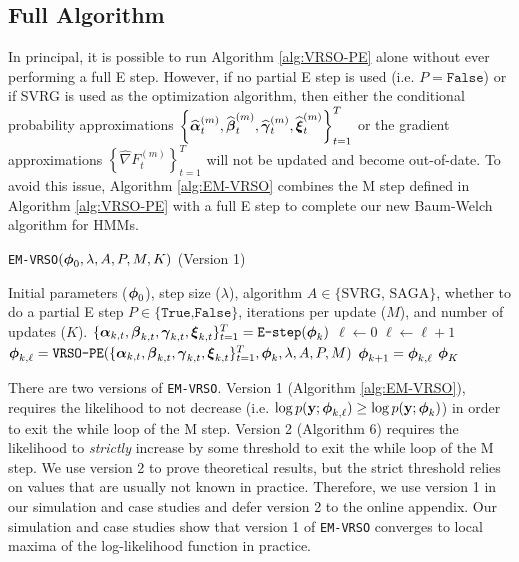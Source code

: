 \subsection{Full Algorithm}

In principal, it is possible to run Algorithm \ref{alg:VRSO-PE} alone without ever performing a full E step. However, if no partial E step is used (i.e. $P = \texttt{False}$) or if SVRG is used as the optimization algorithm, then either the conditional probability approximations $\left\{\widehat {\boldsymbol{\alpha}}_t^{(m)}, \widehat {\boldsymbol{\beta}}_t^{(m)}, \widehat {\boldsymbol{\gamma}}_t^{(m)}, \widehat {\boldsymbol{\xi}}_t^{(m)} \right\}_{t=1}^T$ or the gradient approximations $\left\{\widehat \nabla F_{t}^{(m)} \right\}_{t=1}^T$ will not be updated and become out-of-date. To avoid this issue, Algorithm \ref{alg:EM-VRSO} combines the M step defined in Algorithm \ref{alg:VRSO-PE} with a full E step to complete our new Baum-Welch algorithm for HMMs.

\begin{algorithm}
\caption{\texttt{EM-VRSO}$(\boldsymbol{\phi}_0,\lambda, A, P, M, K)$ (Version 1)}\label{alg:EM-VRSO}
\begin{algorithmic}[1]
\Require Initial parameters ($\boldsymbol{\phi}_{0}$), step size ($\lambda$), algorithm $A \in \{\text{SVRG, SAGA}\}$, whether to do a partial E step $P \in \{\texttt{True,False}\}$, iterations per update ($M$), and number of updates ($K$).
%
% 
\State $\{\boldsymbol{\alpha}_{k,t}, \boldsymbol{\beta}_{k,t}, \boldsymbol{\gamma}_{k,t}, \boldsymbol{\xi}_{k,t}\}_{t=1}^T = \texttt{E-step}(\boldsymbol{\phi}_{k})$ 
%
\State $\ell \gets 0$ 
%
\State $\ell \gets \ell+1$
\State $\boldsymbol{\phi}_{k,\ell} = \texttt{VRSO-PE}(\{\boldsymbol{\alpha}_{k,t}, \boldsymbol{\beta}_{k,t}, \boldsymbol{\gamma}_{k,t}, \boldsymbol{\xi}_{k,t}\}_{t=1}^T,\boldsymbol{\phi}_k,\lambda,A,P,M)$
%
\EndWhile
\State $\boldsymbol{\phi}_{k+1} = \boldsymbol{\phi}_{k,\ell}$
\EndFor
\State \Return $\boldsymbol{\phi}_K$
\end{algorithmic}
\end{algorithm}

There are two versions of \texttt{EM-VRSO}. Version 1 (Algorithm \ref{alg:EM-VRSO}), requires the likelihood to not decrease (i.e. $\log p(\mathbf{y};\boldsymbol{\phi}_{k,\ell}) \geq \log p(\mathbf{y};\boldsymbol{\phi}_{k})$) in order to exit the while loop of the M step. Version 2 (Algorithm 6) requires the likelihood to \textit{strictly} increase by some threshold to exit the while loop of the M step. We use version 2 to prove theoretical results, but the strict threshold relies on values that are usually not known in practice. Therefore, we use version 1 in our simulation and case studies and defer version 2 to the online appendix. Our simulation and case studies show that version 1 of \texttt{EM-VRSO} converges to local maxima of the log-likelihood function in practice. 


